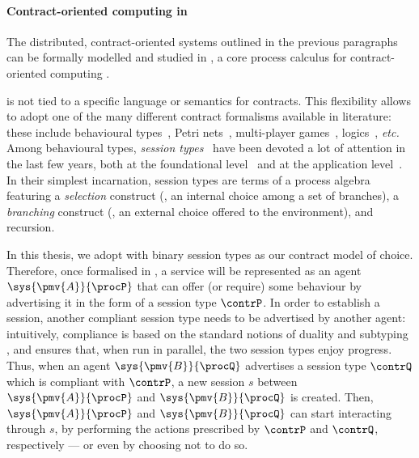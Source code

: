 \paragraph{Contract-oriented computing in \coco}

The distributed, contract-oriented systems outlined in the previous paragraphs can be formally modelled and studied in \coco, a core process calculus for contract-oriented computing \cite{BZ10lics,BTZ12sacs}.

\coco is not tied to a specific language or semantics for contracts. This flexibility allows to adopt one of the many different contract formalisms available in literature: these include behavioural types~\cite{Bravetti07sc,Honda98esop,Honda08popl,Castagna09toplas}, Petri nets~\cite{Aalst10cj,BCP13fsen,BCP15scp}, multi-player games~\cite{BCZ13post,BCPZ15jlamp}, logics~\cite{BZ10lics,BTZ12sacs}, \emph{etc.} %
Among behavioural types, \emph{session types}~\cite{Honda93concur,Honda98esop} have been devoted a lot of attention in the last few years, both at the foundational level~\cite{Honda08popl,Bocchi10concur,Castagna11lmcs,Lange12concur,Denielou13icalp,Caires10concur,Wadler14jfp,Gay10jfp,Carbone14concur,Bernardi14concur,BartolettiSZ14Concur} and at the application level~\cite{Corin08secure,Yoshida13scribble,Neykova14coordination,Franco13beat}.
In their simplest incarnation, session types are terms of a process algebra featuring a \emph{selection} construct (\ie, an internal choice among a set of branches), a \emph{branching} construct (\ie, an external choice offered to the environment), and recursion.

In this thesis, we adopt \coco with binary session types as our contract model of choice.
Therefore, once formalised in \coco, a service will be represented as an agent $\sys{\pmv{A}}{\procP}$ that can offer (or require) some behaviour by advertising it in the form of a session type $\contrP$.
In order to establish a session, another compliant session type needs to be advertised by another agent: intuitively, compliance is based on the standard notions of duality and subtyping \cite{Gay1999Subtyping,Gay2005Subtyping,Barbanera10ppdp}, and ensures that, when run in parallel, the two session types enjoy progress. 
Thus, when an agent $\sys{\pmv{B}}{\procQ}$ advertises a session type $\contrQ$ which is compliant with $\contrP$, a new session $s$ between $\sys{\pmv{A}}{\procP}$ and $\sys{\pmv{B}}{\procQ}$ is created.
Then, $\sys{\pmv{A}}{\procP}$ and $\sys{\pmv{B}}{\procQ}$ can start interacting through $s$, by performing the actions prescribed by $\contrP$ and $\contrQ$,
respectively --- or even by choosing not to do so.

